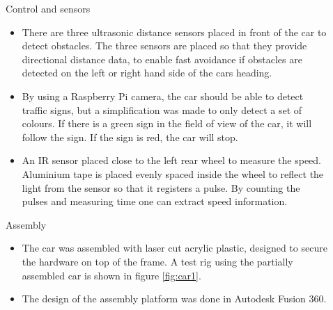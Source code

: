 \documentclass[final,hyperref={pdfpagelabels=false}]{beamer}
\begin{document}
\begin{frame}[t]
\begin{columns}[t]
\begin{column}{.465\textwidth}
\end{column} %

\begin{column}{.03\textwidth}\end{column} %
 
\begin{column}{.465\textwidth} %


\begin{block}{Control and sensors}

    \begin{itemize}
        \item There are three ultrasonic distance sensors placed in front of the car to detect obstacles. The three sensors are placed so that they provide directional distance data, to enable fast avoidance if obstacles are detected on the left or right hand side of the cars heading. 
        
        \item By using a Raspberry Pi camera, the car should be able to detect traffic signs, but a simplification was made to only detect a set of colours. If there is a green sign in the field of view of the car, it will follow the sign. If the sign is red, the car will stop.  
        
        \item An IR sensor placed close to the left rear wheel to measure the speed. Aluminium tape is placed evenly spaced inside the wheel to reflect the light from the sensor so that it registers a pulse. By counting the pulses and measuring time one can extract speed information.
    \end{itemize}
    
    \end{block}



    \begin{block}{Assembly}

        \begin{itemize}
            \item The car was assembled with laser cut acrylic plastic, designed to secure the hardware on top of the frame. A test rig using the partially assembled car is shown in figure \ref{fig:car1}.
            \item The design of the assembly platform was done in Autodesk Fusion 360.
            

\end{itemize}
\end{block}
\end{column}
\end{columns}
\end{frame}
\end{document}
